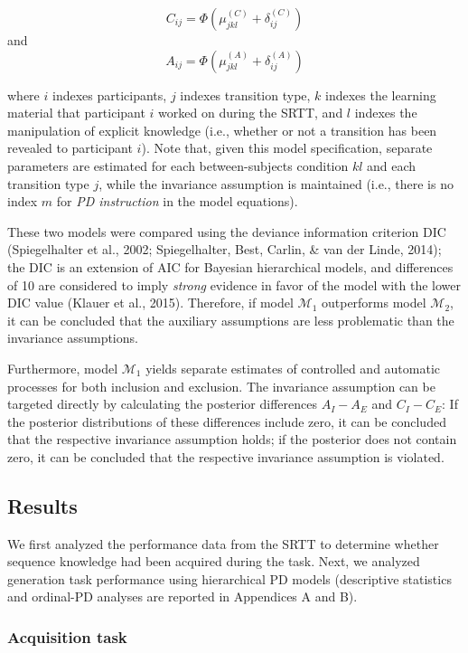\documentclass[floatsintext,doc]{apa6}
\theoremstyle{definition}
\theoremstyle{definition}
\theoremstyle{definition}
\theoremstyle{remark}
\begin{document}
\[
  C_{ij} = \Phi(\mu_{jkl}^{(C)} + \delta_{ij}^{(C)})
\] and \[
  A_{ij} = \Phi(\mu_{jkl}^{(A)} + \delta_{ij}^{(A)})
\]

where \(i\) indexes participants, \(j\) indexes transition type, \(k\)
indexes the learning material that participant \(i\) worked on during
the SRTT, and \(l\) indexes the manipulation of explicit knowledge
(i.e., whether or not a transition has been revealed to participant
\(i\)). Note that, given this model specification, separate parameters
are estimated for each between-subjects condition \(kl\) and each
transition type \(j\), while the invariance assumption is maintained
(i.e., there is no index \(m\) for \emph{PD instruction} in the model
equations).

These two models were compared using the deviance information criterion
DIC (Spiegelhalter et al., 2002; Spiegelhalter, Best, Carlin, \& van der
Linde, 2014); the DIC is an extension of AIC for Bayesian hierarchical
models, and differences of 10 are considered to imply \emph{strong}
evidence in favor of the model with the lower DIC value (Klauer et al.,
2015). Therefore, if model \(\mathcal{M}_1\) outperforms model
\(\mathcal{M}_2\), it can be concluded that the auxiliary assumptions
are less problematic than the invariance assumptions.

Furthermore, model \(\mathcal{M}_1\) yields separate estimates of
controlled and automatic processes for both inclusion and exclusion. The
invariance assumption can be targeted directly by calculating the
posterior differences \(A_{I} - A_{E}\) and \(C_{I} - C_{E}\): If the
posterior distributions of these differences include zero, it can be
concluded that the respective invariance assumption holds; if the
posterior does not contain zero, it can be concluded that the respective
invariance assumption is violated.

\subsection{Results}\label{results-1}

We first analyzed the performance data from the SRTT to determine
whether sequence knowledge had been acquired during the task. Next, we
analyzed generation task performance using hierarchical PD models
(descriptive statistics and ordinal-PD analyses are reported in
Appendices A and B).

\subsubsection{Acquisition task}\label{acquisition-task-1}
\end{document}
